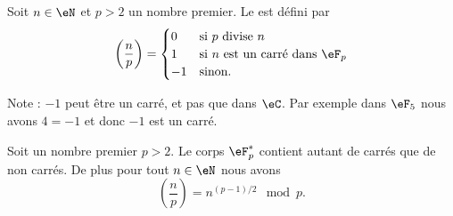 \begin{definition}
	Soit \( n\in \eN\) et \( p>2\) un nombre premier. Le  est défini par
	\begin{equation}
		\left( \frac{ n }{ p } \right)=\begin{cases}
			0  & \text{si } p\text{ divise } n                \\
			1  & \text{si } n\text{ est un carré dans } \eF_p \\
			-1 & \text{sinon}.
		\end{cases}
	\end{equation}
\end{definition}

Note : \( -1\) peut être un carré, et pas que dans \( \eC\). Par exemple dans \( \eF_5\) nous avons \( 4=-1\) et donc \( -1\) est un carré.

\begin{proposition} \label{PropcGsJjk}
	Soit un nombre premier \( p>2\). Le corps \( \eF_p^*\) contient autant de carrés que de non carrés. De plus pour tout \( n\in \eN\) nous avons
	\begin{equation}    \label{Eqbcugos}
		\left(\frac{n}{p}\right)=n^{(p-1)/2}\mod p.
	\end{equation}
\end{proposition}

